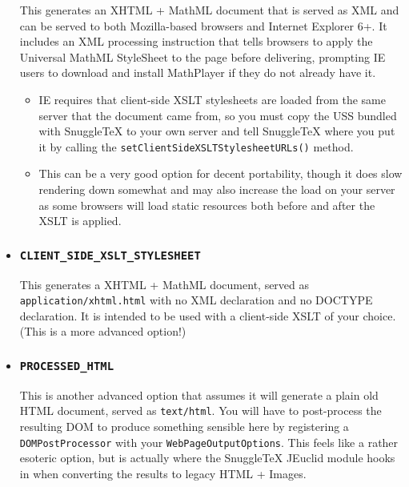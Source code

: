 \begin{itemize}
  This generates an XHTML + MathML document that is served as XML and can be
  served to both Mozilla-based browsers and Internet Explorer 6+. It includes an
  XML processing instruction that tells browsers to apply the Universal MathML
  StyleSheet to the page before delivering, prompting IE users to download and
  install MathPlayer if they do not already have it.
  \begin{itemize}
    \item IE requires that client-side XSLT stylesheets are loaded from the same server
      that the document came from, so you must copy the USS bundled with SnuggleTeX to
      your own server and tell SnuggleTeX where you put it by calling the
      \verb|setClientSideXSLTStylesheetURLs()| method.
    \item This can be a very good option for decent portability, though it does slow
      rendering down somewhat and may also increase the load on your server as some
      browsers will load static resources both before and after the XSLT is applied.
  \end{itemize}

\item
  \subsubsection*{\verb|CLIENT_SIDE_XSLT_STYLESHEET|}

  This generates a XHTML + MathML document,
  served as \verb|application/xhtml.html| with no XML declaration and no DOCTYPE declaration.
  It is intended to be used with a client-side XSLT of your choice.
  (This is a more advanced option!)

\item
  \subsubsection*{\verb|PROCESSED_HTML|}

  This is another advanced option that assumes it will generate a plain old
  HTML document, served as \verb|text/html|.
  You will have to post-process the resulting DOM to produce something sensible here
  by registering a \verb|DOMPostProcessor| with your \verb|WebPageOutputOptions|.
  This feels like a rather esoteric option, but is actually where the SnuggleTeX JEuclid
  module hooks in when converting the results to legacy HTML + Images.
\end{itemize}




